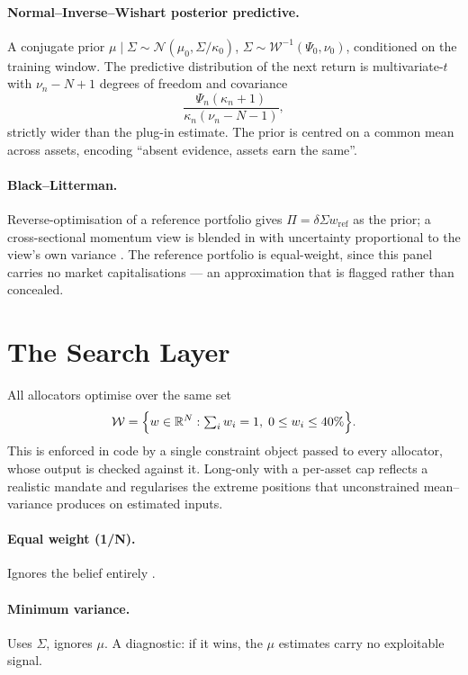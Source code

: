 \documentclass[a4paper,12pt]{article}
\begin{document}
\paragraph{Normal--Inverse--Wishart posterior predictive.} A conjugate prior
$\mu \mid \Sigma \sim \mathcal{N}(\mu_0, \Sigma/\kappa_0)$,
$\Sigma \sim \mathcal{W}^{-1}(\Psi_0, \nu_0)$, conditioned on the training window.
The predictive distribution of the next return is multivariate-$t$ with
$\nu_n - N + 1$ degrees of freedom and covariance
\[
\frac{\Psi_n (\kappa_n + 1)}{\kappa_n (\nu_n - N - 1)},
\]
strictly wider than the plug-in estimate. The prior is centred on a common mean
across assets, encoding ``absent evidence, assets earn the same''.

\paragraph{Black--Litterman.} Reverse-optimisation of a reference portfolio gives
$\Pi = \delta \Sigma w_{\text{ref}}$ as the prior; a cross-sectional momentum view
is blended in with uncertainty proportional to the view's own variance
\citep{black1992}. The reference portfolio is equal-weight, since this panel
carries no market capitalisations --- an approximation that is flagged rather than
concealed.

\section{The Search Layer}
All allocators optimise over the same set
\[
\mathcal{W} = \Big\{ w \in \mathbb{R}^{N} : \textstyle\sum_i w_i = 1,\; 0 \le w_i \le 40\% \Big\}.
\]
This is enforced in code by a single constraint object passed to every allocator,
whose output is checked against it. Long-only with a per-asset cap reflects a
realistic mandate and regularises the extreme positions that unconstrained
mean--variance produces on estimated inputs.

\paragraph{Equal weight (1/N).} Ignores the belief entirely \citep{demiguel2009}.

\paragraph{Minimum variance.} Uses $\Sigma$, ignores $\mu$. A diagnostic: if it
wins, the $\mu$ estimates carry no exploitable signal.
\end{document}

